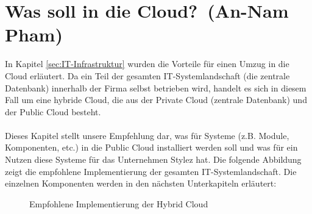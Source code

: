 \section{\glqq Was soll in die Cloud?\grqq~(An-Nam Pham)}
In Kapitel \ref{sec:IT-Infrastruktur} wurden die Vorteile für einen Umzug in die Cloud erläutert.
Da ein Teil der gesamten IT-Systemlandschaft (die zentrale Datenbank) innerhalb der Firma selbst betrieben wird, handelt es sich in diesem Fall um eine hybride Cloud, die aus der Private Cloud (zentrale Datenbank) und der Public Cloud besteht.\\
\\
Dieses Kapitel stellt unsere Empfehlung dar, was für Systeme (z.B. Module, Komponenten, etc.) in die Public Cloud installiert werden soll und was für ein Nutzen diese Systeme für das Unternehmen Stylez hat.
Die folgende Abbildung zeigt die empfohlene Implementierung der gesamten IT-Systemlandschaft. Die einzelnen Komponenten werden in den nächsten Unterkapiteln erläutert:
\begin{figure}[H]
\centering
\begin{minipage}[t]{0.8\textwidth}
\caption{Empfohlene Implementierung der Hybrid Cloud} %
\label{img:Cloud_Implementierung}
\end{minipage}
\end{figure}
